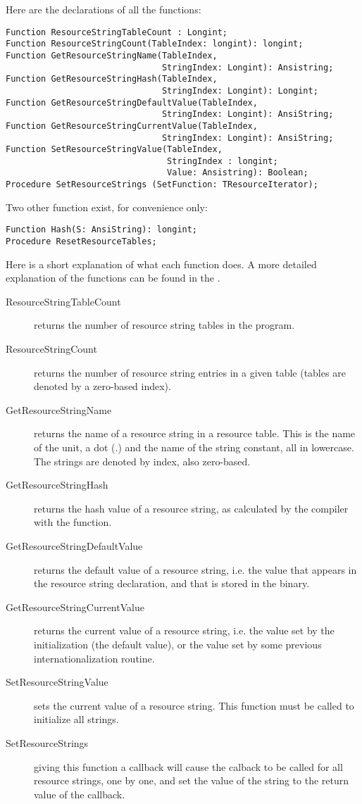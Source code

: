 Here are the declarations of all the functions:
\begin{verbatim}
Function ResourceStringTableCount : Longint;
Function ResourceStringCount(TableIndex: longint): longint;
Function GetResourceStringName(TableIndex,
                               StringIndex: Longint): Ansistring;
Function GetResourceStringHash(TableIndex,
                               StringIndex: Longint): Longint;
Function GetResourceStringDefaultValue(TableIndex,
                               StringIndex: Longint): AnsiString;
Function GetResourceStringCurrentValue(TableIndex,
                               StringIndex: Longint): AnsiString;
Function SetResourceStringValue(TableIndex,
                                StringIndex : longint;
                                Value: Ansistring): Boolean;
Procedure SetResourceStrings (SetFunction: TResourceIterator);
\end{verbatim}
Two other function exist, for convenience only:
\begin{verbatim}
Function Hash(S: AnsiString): longint;
Procedure ResetResourceTables;
\end{verbatim}
Here is a short explanation of what each function does. A more detailed
explanation of the functions can be found in the .
\begin{description}
\item[ResourceStringTableCount] returns the number of resource string tables
in the program.
\item[ResourceStringCount] returns the number of resource string entries in
a given table (tables are denoted by a zero-based index).
\item[GetResourceStringName] returns the name of a resource string in a
resource table. This is the name of the unit, a dot (.) and the name of
the string constant, all in lowercase. The strings are denoted by index,
also zero-based.
\item[GetResourceStringHash] returns the hash value of a resource string, as
calculated by the compiler with the  function.
\item[GetResourceStringDefaultValue] returns the default value of a resource
string, i.e. the value that appears in the resource string declaration, and
that is stored in the binary.
\item[GetResourceStringCurrentValue] returns the current value of a resource
string, i.e. the value set by the initialization (the default value), or the
value set by some previous internationalization routine.
\item[SetResourceStringValue] sets the current value of a resource string.
This function must be called to initialize all strings.
\item[SetResourceStrings] giving this function a callback will cause the
calback to be called for all resource strings, one by one, and set the value
of the string to the return value of the callback.
\end{description}
